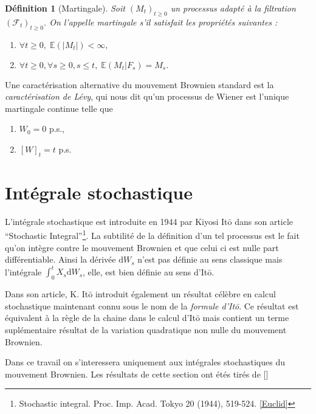 \documentclass[openany]{book}
\newcommand{\F}{\mathscr{F}}
\newcommand{\E}{\mathbb{E}}
\newcommand{\1}{\mathbbm{1}}
\renewcommand{\d}{\mathrm{d}}
\theoremstyle{thmfont}
\theoremstyle{deffont}
\newtheorem{definition}[definition]{Définition}
\theoremstyle{thmfont}
\theoremstyle{deffont}
\newtheorem{remark}[remark]{Remarque}
\begin{document}
  \begin{definition}[Martingale]
  Soit $(M_t)_{t\geq0}$ un processus adapté à la filtration $(\F_t)_{t\geq0}$. On l'appelle \textit{martingale} s'il satisfait les propriétés suivantes : 
  \begin{enumerate}
  \item $\forall t\geq 0,\;\E\left(|M_t|\right) < \infty,$
  \item $\forall t\geq 0, \forall s \geq 0, s \leq t,\;\E\left(M_t|F_s\right) = M_s.$
  \end{enumerate}
  \end{definition}
Une caractérisation alternative du mouvement Brownien standard est la \textit{caractérisation de Lévy}, qui nous dit qu'un processus de Wiener est l'unique martingale continue telle que
\begin{enumerate}
\item $W_0 = 0$ p.s.,
\item $[W]_t = t$ p.s.
  \label{def:MvtBorwnien_caractLevy}
\end{enumerate}


\section{Intégrale stochastique}
L'intégrale stochastique est introduite en 1944 par Kiyosi Itō dans son article ``Stochastic Integral''\footnote{
  Stochastic integral. Proc. Imp. Acad. Tokyo 20 (1944), 519-524.
  \href{https://djalil.chafai.net/docs/M2/history-brownian-motion/Ito\%20-\%201944.pdf}{[Euclid]}}. La subtilité de la définition d'un tel processus est le fait qu'on intègre contre le mouvement Brownien et que celui ci est nulle part différentiable. Ainsi la dérivée $\d W_s$ n'est pas définie au sens classique mais l'intégrale $\int_0^t X_s \d W_s$, elle, est bien définie au sens d'Itō. {\color{red}  }

Dans son article, K. Itō introduit également un résultat célèbre en calcul stochastique maintenant connu sous le nom de la \textit{formule d'Itō}. Ce résultat est équivalent à la règle de la chaine dans le calcul d'Itō mais contient un terme suplémentaire résultat de la variation quadratique non nulle du mouvement Brownien.

Dans ce travail on s'interessera uniquement aux intégrales stochastiques du mouvement Brownien. {\color{red}Les résultats de cette section ont étés tirés de []}
\end{document}
